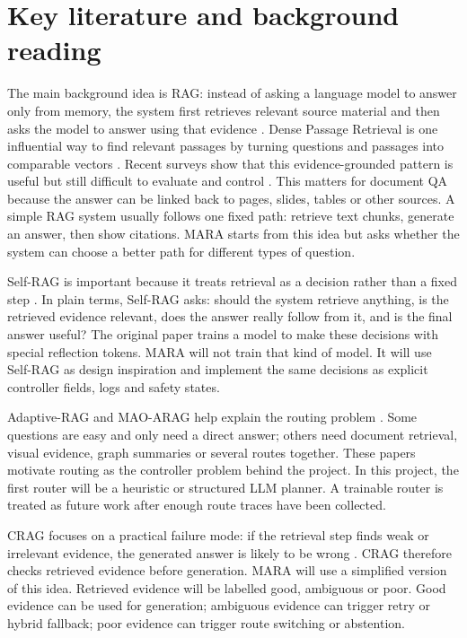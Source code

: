 \documentclass[a4paper,11pt]{article}
\begin{document}
\section{Key literature and background reading}\label{sec:literature}

The main background idea is RAG: instead of asking a language model to answer only from memory, the system first retrieves relevant source material and then asks the model to answer using that evidence \cite{lewis2020rag}. Dense Passage Retrieval is one influential way to find relevant passages by turning questions and passages into comparable vectors \cite{karpukhin2020dpr}. Recent surveys show that this evidence-grounded pattern is useful but still difficult to evaluate and control \cite{gao2023rag}. This matters for document QA because the answer can be linked back to pages, slides, tables or other sources. A simple RAG system usually follows one fixed path: retrieve text chunks, generate an answer, then show citations. MARA starts from this idea but asks whether the system can choose a better path for different types of question.

Self-RAG is important because it treats retrieval as a decision rather than a fixed step \cite{asai2023selfrag}. In plain terms, Self-RAG asks: should the system retrieve anything, is the retrieved evidence relevant, does the answer really follow from it, and is the final answer useful? The original paper trains a model to make these decisions with special reflection tokens. MARA will not train that kind of model. It will use Self-RAG as design inspiration and implement the same decisions as explicit controller fields, logs and safety states.

Adaptive-RAG and MAO-ARAG help explain the routing problem \cite{jeong2024adaptiverag, chen2025maoarag}. Some questions are easy and only need a direct answer; others need document retrieval, visual evidence, graph summaries or several routes together. These papers motivate routing as the controller problem behind the project. In this project, the first router will be a heuristic or structured LLM planner. A trainable router is treated as future work after enough route traces have been collected.

CRAG focuses on a practical failure mode: if the retrieval step finds weak or irrelevant evidence, the generated answer is likely to be wrong \cite{yan2024crag}. CRAG therefore checks retrieved evidence before generation. MARA will use a simplified version of this idea. Retrieved evidence will be labelled good, ambiguous or poor. Good evidence can be used for generation; ambiguous evidence can trigger retry or hybrid fallback; poor evidence can trigger route switching or abstention.
\end{document}
